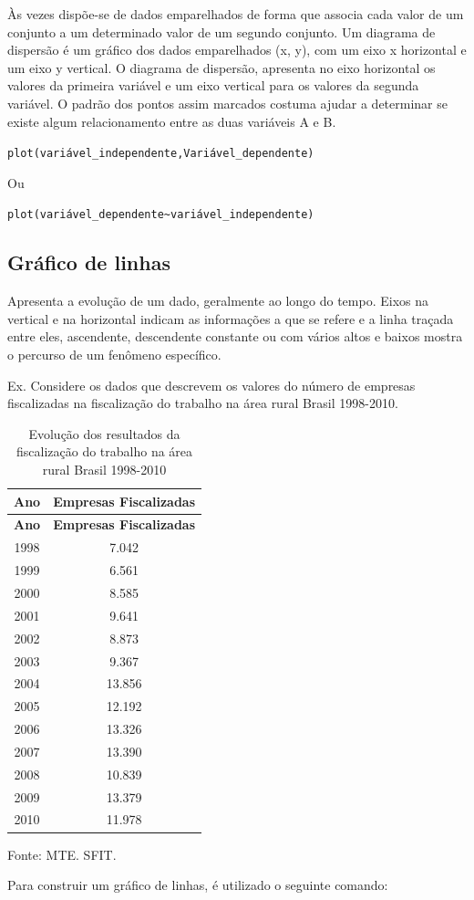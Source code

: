 \documentclass[12pt,brazil,oneside]{book}
\begin{document}
Às vezes dispõe-se de dados emparelhados de forma que associa cada valor de um conjunto a um determinado valor de um segundo conjunto. Um diagrama de dispersão é um gráfico dos dados emparelhados (x, y), com um eixo x horizontal e um eixo y vertical. O diagrama de dispersão, apresenta no eixo horizontal os valores da primeira variável e um eixo vertical para os valores da segunda variável. O padrão dos pontos assim marcados costuma ajudar a determinar se existe algum relacionamento entre as duas variáveis A e B.

\texttt{plot(variável\_independente,Variável\_dependente)}

Ou

\texttt{plot(variável\_dependente\textasciitilde{}variável\_independente)}

\hypertarget{grafico-de-linhas}{%
\subsection{Gráfico de linhas}\label{grafico-de-linhas}}

Apresenta a evolução de um dado, geralmente ao longo do tempo. Eixos na vertical e na horizontal indicam as informações a que se refere e a linha traçada entre eles, ascendente, descendente constante ou com vários altos e baixos mostra o percurso de um fenômeno específico.

Ex. Considere os dados que descrevem os valores do número de empresas fiscalizadas na fiscalização do trabalho na área rural Brasil 1998-2010.

\begin{longtable}[]{@{}cc@{}}
\caption{\label{tab:evolres}Evolução dos resultados da fiscalização do trabalho na área rural Brasil 1998-2010}\tabularnewline
\toprule
\textbf{Ano} & \textbf{Empresas Fiscalizadas}\tabularnewline
\midrule
\endfirsthead
\toprule
\textbf{Ano} & \textbf{Empresas Fiscalizadas}\tabularnewline
\midrule
\endhead
1998 & 7.042\tabularnewline
1999 & 6.561\tabularnewline
2000 & 8.585\tabularnewline
2001 & 9.641\tabularnewline
2002 & 8.873\tabularnewline
2003 & 9.367\tabularnewline
2004 & 13.856\tabularnewline
2005 & 12.192\tabularnewline
2006 & 13.326\tabularnewline
2007 & 13.390\tabularnewline
2008 & 10.839\tabularnewline
2009 & 13.379\tabularnewline
2010 & 11.978\tabularnewline
\bottomrule
\end{longtable}

Fonte: MTE. SFIT.

Para construir um gráfico de linhas, é utilizado o seguinte comando:
\end{document}
